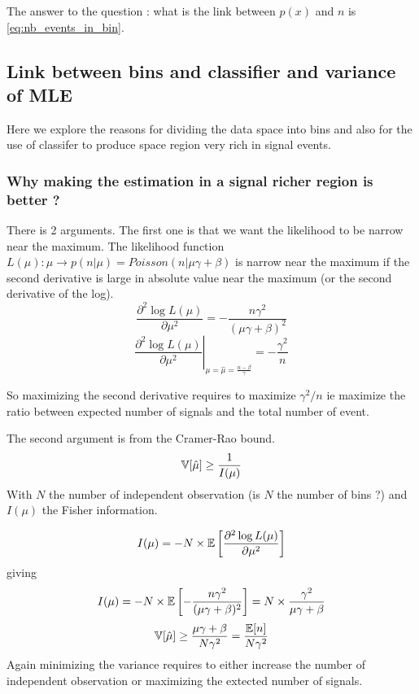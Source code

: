 The answer to the question : what is the link between $p(x)$ and $n$ is \autoref{eq:nb_events_in_bin}.





\subsection{Link between bins and classifier and variance of MLE} %
\label{sub:link_between_bins_and_classifier_and_variance_of_mle}

Here we explore the reasons for dividing the data space into bins and also for the use of classifer to produce space region very rich in signal events.





\subsubsection{Why making the estimation in a signal richer region is better ?}

There is 2 arguments.
The first one is that we want the likelihood to be narrow near the maximum.
The likelihood function $L(\mu) : \mu \to p(n|\mu) = Poisson(n|\mu\gamma + \beta)$ is narrow near the maximum if the second derivative is large in absolute value near the maximum (or the second derivative of the log).
\begin{equation}
    \frac{\partial^2 \log L(\mu)}{\partial \mu^2} = -\frac{n \gamma^2}{(\mu\gamma + \beta)^2}
\end{equation}
\begin{equation}
    \left . \frac{\partial^2 \log L(\mu)}{\partial \mu^2}  \right |_{\mu=\hat \mu = \frac{n-\beta}{\gamma}} = -\frac{\gamma^2}{n}
\end{equation}

So maximizing the second derivative requires to maximize $\gamma^2 / n$ ie maximize the ratio between expected number of signals and the total number of event.

The second argument is from the Cramer-Rao bound\needcite.
\begin{equation}
    \mathbb{V}[\hat \mu] \geq \frac{1}{I(\mu)}
\end{equation}
With $N$ the number of independent observation (is $N$ the number of bins ?) and $I(\mu)$ the Fisher information.

\begin{equation}
    I(\mu) = - N \times \mathbb{E}\left [\frac{\partial^2 \log L(\mu)}{\partial \mu^2} \right ]
\end{equation}
giving 
\begin{equation}
    I(\mu) = - N \times \mathbb{E}\left [-\frac{n \gamma^2}{(\mu\gamma + \beta)^2} \right ] = N \times \frac{\gamma^2}{\mu\gamma + \beta}
\end{equation}
\begin{equation}
    \mathbb{V}[\hat \mu] \geq  \frac{\mu\gamma + \beta}{N\gamma^2} = \frac{\mathbb{E}[n]}{N\gamma^2}
\end{equation}
Again minimizing the variance requires to either increase the number of independent observation or maximizing the extected number of signals.

